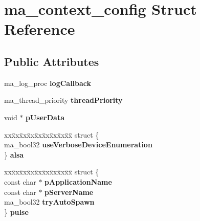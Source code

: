 \hypertarget{structma__context__config}{}\section{ma\+\_\+context\+\_\+config Struct Reference}
\label{structma__context__config}
\subsection*{Public Attributes}
\begin{DoxyCompactItemize}
\item 
\mbox{\label{structma__context__config_a76c224ef9e290d3544afb4d8026dbda8}} 
ma\+\_\+log\+\_\+proc {\bfseries log\+Callback}
\item 
\mbox{\label{structma__context__config_a1b67f2fb03513395e3dc537e8781a7ae}} 
ma\+\_\+thread\+\_\+priority {\bfseries thread\+Priority}
\item 
\mbox{\label{structma__context__config_a3bac4950716c85e19c28516137eeaca0}} 
void $\ast$ {\bfseries p\+User\+Data}
\item 
\mbox{\label{structma__context__config_a660a81f2198eb56d19cd261f26c7b718}} 
\begin{tabbing}
xx\=xx\=xx\=xx\=xx\=xx\=xx\=xx\=xx\=\kill
struct \{\\
\>ma\_bool32 {\bfseries useVerboseDeviceEnumeration}\\
\} {\bfseries alsa}\\

\end{tabbing}\item 
\mbox{\label{structma__context__config_a247084a6502a9e9f5c762e0ec0208a66}} 
\begin{tabbing}
xx\=xx\=xx\=xx\=xx\=xx\=xx\=xx\=xx\=\kill
struct \{\\
\>const char $\ast$ {\bfseries pApplicationName}\\
\>const char $\ast$ {\bfseries pServerName}\\
\>ma\_bool32 {\bfseries tryAutoSpawn}\\
\} {\bfseries pulse}\\


\end{tabbing}
\end{DoxyCompactItemize}
